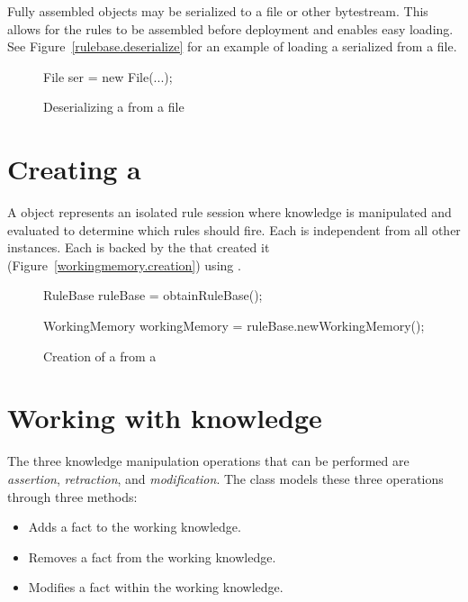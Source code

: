 Fully assembled  objects may be serialized to a
file or other bytestream.  This allows for the rules to be assembled
before deployment and enables easy loading.  See
Figure~\vref{rulebase.deserialize} for an example of loading a
serialized  from a file.

\begin{figure}
\begin{javaCodelisting}
File ser = new File(...);
\end{javaCodelisting}
\caption{Deserializing a  from a file}
\label{rulebase.deserialize}
\end{figure}

\section{Creating a }

A  object represents an isolated rule
session where knowledge is manipulated and evaluated to determine
which rules should fire.  Each  is independent
from all other instances. Each  is backed by the
 that created it
(Figure~\vref{workingmemory.creation}) using
.

\begin{figure}
\begin{javaCodelisting}
RuleBase ruleBase = obtainRuleBase();

WorkingMemory workingMemory = ruleBase.newWorkingMemory();
\end{javaCodelisting}
\caption{Creation of a  from a
}
\label{workingmemory.creation}
\end{figure}

\section{Working with knowledge}

The three knowledge manipulation operations that can be performed
are \emph{assertion},
\emph{retraction}, and
\emph{modification}.  The
 class models these three operations
through three methods:

\begin{itemize}
  \item {} Adds a fact to 
    the working knowledge.
  \item {} Removes a fact
    from the working knowledge.
  \item {} Modifies a
    fact within the working knowledge.
\end{itemize}

